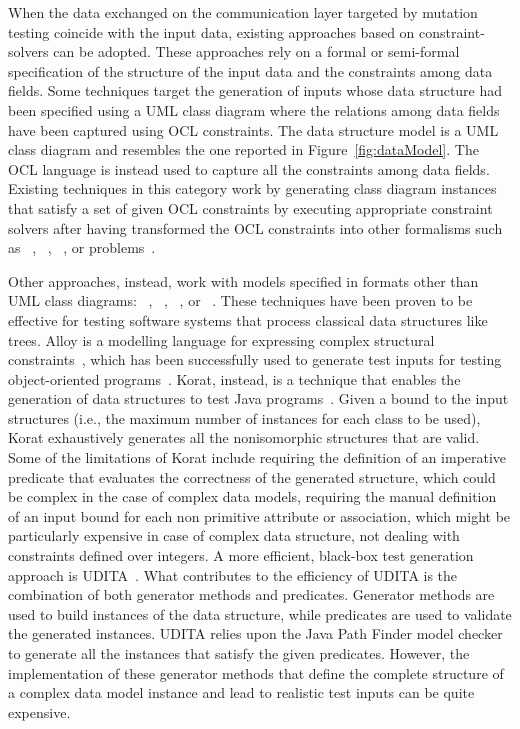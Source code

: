 When the data exchanged on the communication layer targeted by mutation testing coincide with the input data, existing approaches based on constraint-solvers can be adopted. 
These approaches rely on a formal or semi-formal specification of the structure of the input data and the constraints among data fields.
Some techniques target the generation of inputs whose data structure had been specified using a UML class diagram where the relations among data fields have been captured using OCL constraints. The data structure model is a UML class diagram and resembles the one reported in Figure~\ref{fig:dataModel}. The OCL language is instead used to capture all the constraints among data fields. Existing techniques in this category work by generating class diagram instances that satisfy a set of given OCL constraints by executing appropriate constraint solvers after having transformed the OCL constraints into other formalisms such as ~\cite{Uml2alloy}, ~\cite{EMFTOCSP}, ~\cite{Przigoda2016}, or  problems~\cite{Soeken2011}. 

Other approaches, instead, work with models specified in formats other than UML class diagrams:
~\cite{Boyapati-KORAT-ISSTA-2002,gligoric2010test}, ~\cite{Senni-CPLgeneration-TAP-2012}, ~\cite{Khurshid-SpecificationBasedTesting-ASE-2004}, or ~\cite{Horcher-Z-1995}.
These techniques have been proven to be effective for testing software systems that process classical data structures like trees. 
Alloy is a modelling language for expressing complex structural constraints~\cite{Jackson:Alloy:2002},
which has been successfully used to generate test inputs for testing object-oriented programs~\cite{Khurshid-SpecificationBasedTesting-ASE-2004}.
Korat, instead, is a technique that enables the generation of data structures to test Java programs~\cite{Boyapati-KORAT-ISSTA-2002}. Given a bound to the input structures (i.e., the maximum number of instances for each class to be used), Korat exhaustively generates all the nonisomorphic structures that are valid. 
Some of the limitations of Korat include requiring the definition of an imperative predicate that evaluates the correctness of the generated structure, which could be complex in the case of complex data models, requiring the manual definition of an input bound for each non primitive attribute or association, which might be particularly expensive in case of complex data structure,  not dealing with constraints defined over integers.
A more efficient, black-box test generation approach is UDITA~\cite{gligoric2010test}.
What contributes to the efficiency of UDITA is the combination of both generator methods and predicates.
Generator methods are used to build instances of the data structure, while predicates are used to validate the generated instances. UDITA relies upon the Java Path Finder model checker~\cite{Visser-JPF-2004} to generate all the instances that satisfy the given predicates. However, the implementation of these generator methods that define the complete structure of a complex data model instance and lead to realistic test inputs can be quite expensive. 

